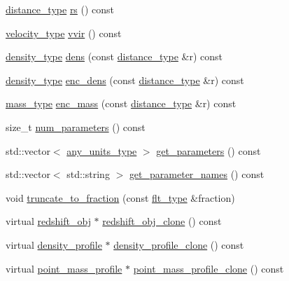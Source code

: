 \begin{DoxyCompactItemize}
\item 
\hyperlink{namespaceIceBRG_a45499647eb87e24c10ab32c628711cec}{distance\+\_\+type} \hyperlink{classIceBRG_1_1point__mass__profile_aad9a12251097b4ccccf2ef02667e5073}{rs} () const 
\item 
\hyperlink{namespaceIceBRG_a34f8ef3b46f3408301e3c28197095eff}{velocity\+\_\+type} \hyperlink{classIceBRG_1_1point__mass__profile_a04bc365103dcae1b248b9e2487edd7ad}{vvir} () const 
\item 
\hyperlink{namespaceIceBRG_a9f5e5cdd641bb4c06f7305dfb5ae0238}{density\+\_\+type} \hyperlink{classIceBRG_1_1point__mass__profile_aa689ec66a40e36d9886c1b8077488161}{dens} (const \hyperlink{namespaceIceBRG_a45499647eb87e24c10ab32c628711cec}{distance\+\_\+type} \&r) const 
\item 
\hyperlink{namespaceIceBRG_a9f5e5cdd641bb4c06f7305dfb5ae0238}{density\+\_\+type} \hyperlink{classIceBRG_1_1point__mass__profile_ab52d614d0c7c163085d70ae78e6b1eed}{enc\+\_\+dens} (const \hyperlink{namespaceIceBRG_a45499647eb87e24c10ab32c628711cec}{distance\+\_\+type} \&r) const 
\item 
\hyperlink{namespaceIceBRG_a1be72ac4918a9b029f2eefa084213e35}{mass\+\_\+type} \hyperlink{classIceBRG_1_1point__mass__profile_a2e72fef9bc04039bd9119453f4aa6b13}{enc\+\_\+mass} (const \hyperlink{namespaceIceBRG_a45499647eb87e24c10ab32c628711cec}{distance\+\_\+type} \&r) const 
\item 
size\+\_\+t \hyperlink{classIceBRG_1_1point__mass__profile_a71f96138938e5e9edd0c755f131ddf5e}{num\+\_\+parameters} () const 
\item 
std\+::vector$<$ \hyperlink{namespaceIceBRG_a3101fc159e191fa99c4ec14e445df96e}{any\+\_\+units\+\_\+type} $>$ \hyperlink{classIceBRG_1_1point__mass__profile_a52bdbf1072d13ddef48df90339366ab3}{get\+\_\+parameters} () const 
\item 
std\+::vector$<$ std\+::string $>$ \hyperlink{classIceBRG_1_1point__mass__profile_a58ddc44e9a7fa78f1ec07e35db5bc141}{get\+\_\+parameter\+\_\+names} () const 
\item 
void \hyperlink{classIceBRG_1_1point__mass__profile_a17f71bc76434aea87a2043fbc526af63}{truncate\+\_\+to\+\_\+fraction} (const \hyperlink{lib_2IceBRG__main_2common_8h_ad0f130a56eeb944d9ef2692ee881ecc4}{flt\+\_\+type} \&fraction)
\item 
virtual \hyperlink{classIceBRG_1_1redshift__obj}{redshift\+\_\+obj} $\ast$ \hyperlink{classIceBRG_1_1point__mass__profile_a652993749492f4c718b77386ea3ba7af}{redshift\+\_\+obj\+\_\+clone} () const 
\item 
virtual \hyperlink{classIceBRG_1_1density__profile}{density\+\_\+profile} $\ast$ \hyperlink{classIceBRG_1_1point__mass__profile_a0e02fa9204b4d6718fb0a27b61b38b69}{density\+\_\+profile\+\_\+clone} () const 
\item 
virtual \hyperlink{classIceBRG_1_1point__mass__profile}{point\+\_\+mass\+\_\+profile} $\ast$ \hyperlink{classIceBRG_1_1point__mass__profile_ac1abfeb97d5272bf80c1aaa360b87cd8}{point\+\_\+mass\+\_\+profile\+\_\+clone} () const 
\end{DoxyCompactItemize}

